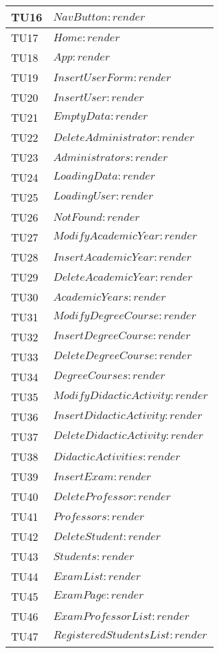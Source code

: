 \begin{longtable}{|>{\centering\arraybackslash}p{2cm}| p{15cm}|}
	\hline
	TU16 & $NavButton:render$\\
	\hline
	TU17 & $Home:render$\\
	\hline
	TU18 & $App:render$\\
	\hline
	TU19 & $InsertUserForm:render$\\
	\hline
	TU20 & $InsertUser:render$\\
	\hline
	TU21 & $EmptyData:render$\\
	\hline
	TU22 & $DeleteAdministrator:render$\\
	\hline
	TU23 & $Administrators:render$\\
	\hline
	TU24 & $LoadingData:render$\\
	\hline
	TU25 & $LoadingUser:render$\\
	\hline
	TU26 & $NotFound:render$\\
	\hline
	TU27 & $ModifyAcademicYear:render$\\
	\hline
	TU28 & $InsertAcademicYear:render$\\
	\hline
	TU29 & $DeleteAcademicYear:render$\\
	\hline
	TU30 & $AcademicYears:render$\\
	\hline
	TU31 & $ModifyDegreeCourse:render$\\
	\hline
	TU32 & $InsertDegreeCourse:render$\\
	\hline
	TU33 & $DeleteDegreeCourse:render$\\
	\hline
	TU34 & $DegreeCourses:render$\\
	\hline
	TU35 & $ModifyDidacticActivity:render$\\
	\hline
	TU36 & $InsertDidacticActivity:render$\\
	\hline
	TU37 & $DeleteDidacticActivity:render$\\
	\hline
	TU38 & $DidacticActivities:render$\\
	\hline
	TU39 & $InsertExam:render$\\
	\hline
	TU40 & $DeleteProfessor:render$\\
	\hline
	TU41 & $Professors:render$\\
	\hline
	TU42 & $DeleteStudent:render$\\
	\hline
	TU43 & $Students:render$\\
	\hline
	TU44 & $ExamList:render$\\
	\hline
	TU45 & $ExamPage:render$\\
	\hline
	TU46 & $ExamProfessorList:render$\\
	\hline
	TU47 & $RegisteredStudentsList:render$\\

\end{longtable}
